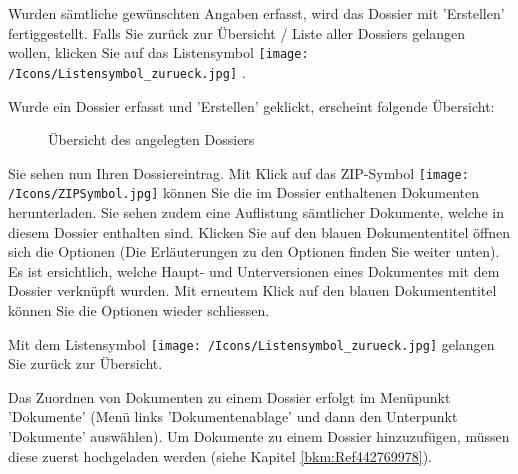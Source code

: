 Wurden sämtliche gewünschten Angaben erfasst, wird das Dossier mit 'Erstellen'  fertiggestellt. Falls Sie zurück zur Übersicht / Liste aller Dossiers gelangen wollen, klicken Sie auf das Listensymbol \texttt{[image: /Icons/Listensymbol\_zurueck.jpg]} .

\vspace{\baselineskip}

Wurde ein Dossier erfasst und 'Erstellen' geklickt, erscheint folgende Übersicht:

\begin{figure}[H]
\caption{Übersicht des angelegten Dossiers}
\end{figure}

Sie sehen nun Ihren Dossiereintrag. Mit Klick auf das ZIP-Symbol \texttt{[image: /Icons/ZIPSymbol.jpg]}  können Sie die im Dossier enthaltenen Dokumenten herunterladen. Sie sehen zudem eine Auflistung sämtlicher Dokumente, welche in diesem Dossier enthalten sind. Klicken Sie auf den blauen Dokumententitel  öffnen sich die Optionen (Die Erläuterungen zu den Optionen finden Sie weiter unten). Es ist ersichtlich, welche Haupt- und Unterversionen eines Dokumentes mit dem Dossier verknüpft wurden. Mit erneutem Klick auf den blauen Dokumententitel können Sie die Optionen wieder schliessen.

Mit dem Listensymbol \texttt{[image: /Icons/Listensymbol\_zurueck.jpg]}  gelangen Sie zurück zur Übersicht.

\vspace{\baselineskip}

Das Zuordnen von Dokumenten zu einem Dossier erfolgt im Menüpunkt 'Dokumente' (Menü links 'Dokumentenablage' und dann den Unterpunkt 'Dokumente' auswählen). Um Dokumente zu einem Dossier hinzuzufügen, müssen diese zuerst hochgeladen werden (siehe Kapitel \ref{bkm:Ref442769978}).

